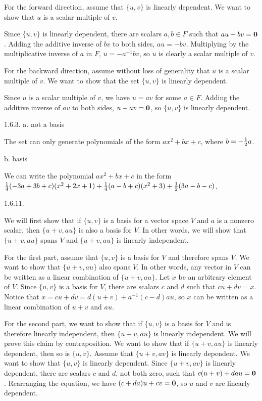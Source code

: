 For the forward direction, assume that $\{u,v\}$ is linearly dependent.
We want to show that $u$ is a scalar multiple of $v$.

Since $\{u,v\}$ is linearly dependent, there are scalars $a,b \in F$
such that $au + bv = {\bf 0}$.
Adding the additive inverse of $bv$ to both sides, $au = -bv$.
Multiplying by the multiplicative inverse of $a$ in $F$, $u = -a^{-1}bv$,
so $u$ is clearly a scalar multiple of $v$.

For the backward direction, assume without loss of generality that $u$ is
a scalar multiple of $v$.
We want to show that the set $\{u,v\}$ is linearly dependent.

Since $u$ is a scalar multiple of $v$, we have $u = av$ for some $a \in F$.
Adding the additive inverse of $av$ to both sides, $u - av = {\bf 0}$,
so $\{u,v\}$ is linearly dependent.
\bigskip
\item{1.6.3.} a. not a basis

The set can only generate polynomials of the form $ax^2 + bx + c$,
where $b = -{1 \over 2}a$.
\medskip
\item{} b. basis

We can write the polynomial $ax^2 + bx + c$ in the form
${1 \over 4}(-3a + 3b + c)(x^2 + 2x + 1) +
{1 \over 4}(a - b + c)(x^2 + 3) + {1 \over 2}(3a - b - c)$.
\bigskip
\item{1.6.11.}

We will first show that if $\{u,v\}$ is a basis for a vector space $V$
and $a$ is a nonzero scalar, then $\{u+v,au\}$ is also a basis for $V$.
In other words, we will show that $\{u+v,au\}$ spans $V$
and $\{u+v,au\}$ is linearly independent.

For the first part, assume that $\{u,v\}$ is a basis for $V$
and therefore spans $V$.
We want to show that $\{u+v,au\}$ also spans $V$.
In other words, any vector in $V$
can be written as a linear combination of $\{u+v,au\}$.
Let $x$ be an arbitrary element of $V$.
Since $\{u,v\}$ is a basis for $V$,
there are scalars $c$ and $d$ such that $cu + dv = x$.
Notice that $x = cu + dv = d(u + v) + a^{-1}(c - d)au$, so
$x$ can be written as a linear combination of $u + v$ and $au$.

For the second part, we want to show that if $\{u,v\}$
is a basis for $V$ and is therefore linearly independent,
then $\{u+v,au\}$ is linearly independent.
We will prove this claim by contraposition.
We want to show that if $\{u+v,au\}$ is linearly dependent,
then so is $\{u,v\}$.
Assume that $\{u+v,av\}$ is linearly dependent.
We want to show that $\{u,v\}$ is linearly dependent.
Since $\{u+v,av\}$ is linearly dependent,
there are scalars $c$ and $d$, not both zero,
such that $c(u + v) + dau = {\bf 0}$.
Rearranging the equation, we have $(c + da)u + cv = {\bf 0}$,
so $u$ and $v$ are linearly dependent.

